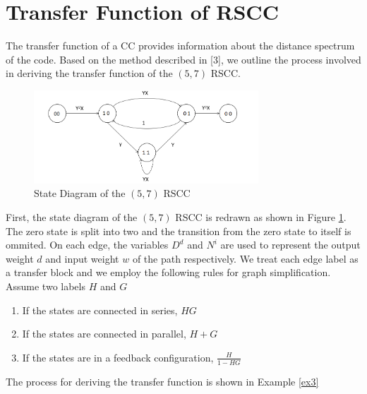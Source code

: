 \documentclass[fontsize=12pt]{article}
\begin{document}
\section{Transfer Function of RSCC}
\label{sec7}
The transfer function of a CC provides information about the distance spectrum of the code. Based on the method described in [3], we outline the process involved in deriving the transfer function of the $(5,7)$ RSCC. 

\begin{figure}[h]
\centering
		\includegraphics[width=0.75\textwidth]{tf.png}
		\caption{State Diagram of the $(5,7)$ RSCC }
		\label{fig4}
		\end{figure}
First, the state diagram of the $(5,7)$ RSCC is redrawn as shown in Figure \ref{fig4}. The zero state is split into two and the transition from the zero state to itself is ommited. On each edge, the variables $D^d$ and $N^i$ are used to represent the output weight $d$ and input weight $w$ of the path respectively. We treat each edge label as a transfer block and we employ the following rules for graph simplification. Assume two labels $H$ and $G$ 

\begin{enumerate}
\item If the states are connected in series, $HG$

\item If the states are connected in parallel, $H+G$

\item If the states are in a feedback configuration, $\frac{H}{1-HG}$
\end{enumerate}

The process for deriving the transfer function is shown in Example {\ref{ex3}}
\end{document}
